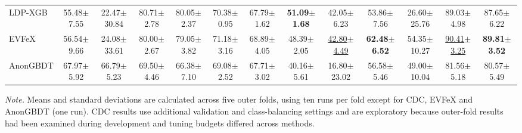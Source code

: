 \begin{table}[!t]
{\begin{tabular}{lcccccccccccc}
LDP-XGB & 55.48\(\pm\)7.55 & 22.47\(\pm\)30.84 & 80.71\(\pm\)2.78 & 80.05\(\pm\)2.37 & 70.38\(\pm\)0.95 & 67.79\(\pm\)1.62 & \textbf{51.09\(\pm\)1.68} & 42.05\(\pm\)6.23 & 53.86\(\pm\)7.56 & 26.60\(\pm\)25.76 & 89.03\(\pm\)4.98 & 87.65\(\pm\)6.22\\
EVFeX & 56.54\(\pm\)9.66 & 24.08\(\pm\)33.61 & 80.00\(\pm\)2.67 & 79.05\(\pm\)3.82 & 71.18\(\pm\)3.16 & 68.89\(\pm\)4.05 & 48.39\(\pm\)2.05 & \underline{42.80\(\pm\)4.49} & \textbf{62.48\(\pm\)6.52} & 54.35\(\pm\)10.27 & \underline{90.41\(\pm\)3.25} & \textbf{89.81\(\pm\)3.52} \\
AnonGBDT & 67.97\(\pm\)5.92 & 66.79\(\pm\)5.23 & 69.50\(\pm\)4.46 & 66.38\(\pm\)7.10 & 69.08\(\pm\)2.52 & 67.71\(\pm\)3.02 & 40.16\(\pm\)5.61 & 16.80\(\pm\)23.02 & 56.58\(\pm\)5.46 & 49.00\(\pm\)10.04 & 81.56\(\pm\)5.18 & 80.57\(\pm\)5.49 \\
\bottomrule
\end{tabular}%
}
\par\vspace{2pt}
\begin{minipage}{\textwidth}
\scriptsize\raggedright
\textit{Note.} Means and standard deviations are calculated across five outer folds, using ten runs per fold except for CDC, EVFeX and AnonGBDT (one run). CDC results use additional validation and class-balancing settings and are exploratory because outer-fold results had been examined during development and tuning budgets differed across methods.
\end{minipage}
\end{table}
